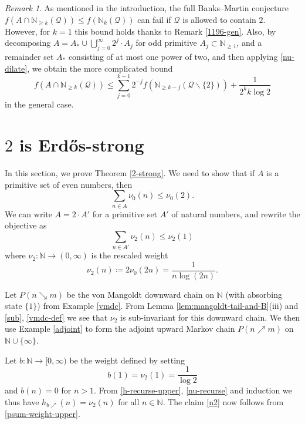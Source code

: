 \documentclass[12pt]{amsart}
\theoremstyle{definition}
\theoremstyle{remark}
\newtheorem{remark}[theorem]{Remark}
\numberwithin{equation}{section}
\newcommand{\N}{{\mathbb N}}
\newcommand{\1}{{\mathbf 1}}
\newcommand{\Erdos}{{Erd\H{o}s}}
\begin{document}
\begin{remark}\label{GPT-rem-3}  As mentioned in the introduction, the full Banks--Martin conjecture 
$f(A \cap \N_{\geq k}({\mathcal Q})) \leq f(\N_k({\mathcal Q}))$ can fail if ${\mathcal Q}$ is allowed to contain $2$.  However,
for $k=1$ this bound holds thanks to Remark \ref{1196-gen}.  Also, by decomposing $A = A_* \cup \bigcup_{j=0}^\infty 2^j \cdot A_j$ for odd primitive $A_j \subset \N_{\geq 1}$, and a remainder set $A_*$ consisting of at most one power of two, and then applying \eqref{nu-dilate}, we obtain the more complicated bound
$$ f(A \cap \N_{\geq k}({\mathcal Q})) \leq \sum_{j=0}^{k-1} 2^{-j} f( \N_{\geq k-j}(\mathcal{Q} \backslash \{2\}) ) + \frac{1}{2^k k \log 2}$$
in the general case.
\end{remark}

\section{\texorpdfstring{$2$}{2} is \Erdos{}-strong}\label{2-strong-sec}

In this section, we prove Theorem \ref{2-strong}.  We need to show that if $A$ is a primitive set of even numbers, then 
$$\sum_{n \in A} \nu_0(n) \leq \nu_0(2).$$
We can write $A = 2 \cdot A'$ for a primitive set $A'$ of natural numbers, and rewrite the objective as
\begin{equation}\label{n2}
\sum_{n \in A'} \nu_2(n) \leq \nu_2(1)
\end{equation}
where $\nu_2 \colon \N \to (0,\infty)$ is the rescaled weight
$$\nu_2(n) \coloneq 2 \nu_0(2n) = \frac{1}{n \log(2n)}.$$

Let $P(n \searrow m)$ be the von Mangoldt downward chain on $\N$ (with absorbing state $\{1\}$) from Example \ref{vmdc}.  From Lemma \ref{lem:mangoldt-tail-and-B}(iii) and \eqref{sub}, \eqref{vmdc-def} we see that $\nu_2$ is sub-invariant for this downward chain.  We then use Example \ref{adjoint} to form the adjoint upward Markov chain $P(n \nearrow m)$ on $\N \cup \{\infty\}$.

Let $b \colon \N \to [0,\infty)$ be the weight defined by setting 
$$ b(1) = \nu_2(1) = \frac{1}{\log 2}$$
and $b(n)=0$ for $n>1$.  From \eqref{h-recurse-upper}, \eqref{nu-recurse} and induction we thus have $h_{b\nearrow}(n) = \nu_2(n)$ for all $n \in \N$.  The claim \eqref{n2} now follows from \eqref{psum-weight-upper}.
\end{document}
